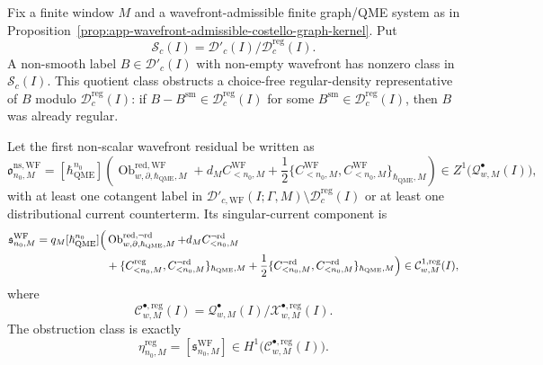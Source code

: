 \begin{thm}
\label{thm:wt-wavefront-singular-current-eta-obstruction}
  Fix a finite window \(M\) and a wavefront-admissible finite graph/QME
  system as in
  Proposition~\ref{prop:app-wavefront-admissible-costello-graph-kernel}.
  Put
  \[
    \mathcal S_c(I)
      =
    \mathcal D'_c(I)/\mathcal D^{\mathrm{reg}}_c(I).
  \]
  A non-smooth label \(B\in\mathcal D'_c(I)\) with
  non-empty wavefront has nonzero class in \(\mathcal S_c(I)\).  This
  quotient class obstructs a choice-free regular-density representative of
  \(B\) modulo \(\mathcal D^{\mathrm{reg}}_c(I)\): if
  \(B-B^{\mathrm{sm}}\in\mathcal D^{\mathrm{reg}}_c(I)\) for some
  \(B^{\mathrm{sm}}\in\mathcal D^{\mathrm{reg}}_c(I)\), then \(B\) was
  already regular.

  Let the first non-scalar wavefront residual be written as
  \[
    \mathfrak o^{\mathrm{ns,WF}}_{n_0,M}
      =
      [\hbar_{\mathrm{QME}}^{n_0}]\left(
        \operatorname{Ob}^{\mathrm{red,WF}}_{w,\partial,\hbar_{\mathrm{QME}},M}
        +d_MC^{\mathrm{WF}}_{<n_0,M}
        +\frac12
          \{C^{\mathrm{WF}}_{<n_0,M},
            C^{\mathrm{WF}}_{<n_0,M}\}_{\hbar_{\mathrm{QME}},M}
      \right)
      \in Z^1\bigl(\mathcal Q^\bullet_{w,M}(I)\bigr),
  \]
  with at least one cotangent label in
  \(\mathcal D'_{c,\mathrm{WF}}(I;\Gamma,M)\setminus
  \mathcal D^{\mathrm{reg}}_c(I)\) or at least one distributional
  current counterterm.  Its singular-current component is
  \begin{equation}\label{eq:wt-wavefront-singular-component}
  \begin{aligned}
    \mathfrak s^{\mathrm{WF}}_{n_0,M}
      =
      q_M[\hbar_{\mathrm{QME}}^{n_0}]\Bigl(
        &\operatorname{Ob}^{\mathrm{red},\neg\mathrm{rd}}_{w,\partial,\hbar_{\mathrm{QME}},M}
        +d_MC^{\neg\mathrm{rd}}_{<n_0,M} \\
        &+\{C^{\mathrm{reg}}_{<n_0,M},
             C^{\neg\mathrm{rd}}_{<n_0,M}\}_{\hbar_{\mathrm{QME}},M}
        +\frac12
          \{C^{\neg\mathrm{rd}}_{<n_0,M},
             C^{\neg\mathrm{rd}}_{<n_0,M}\}_{\hbar_{\mathrm{QME}},M}
      \Bigr)
      \in
      \mathcal C^{1,\mathrm{reg}}_{w,M}(I),
  \end{aligned}
  \end{equation}
  where
  \[
    \mathcal C^{\bullet,\mathrm{reg}}_{w,M}(I)
      =
    \mathcal Q^\bullet_{w,M}(I)/
    \mathcal X^{\bullet,\mathrm{reg}}_{w,M}(I).
  \]
  The obstruction class is exactly
  \[
    \eta^{\mathrm{reg}}_{n_0,M}
      =
    [\mathfrak s^{\mathrm{WF}}_{n_0,M}]
      \in
    H^1\bigl(\mathcal C^{\bullet,\mathrm{reg}}_{w,M}(I)\bigr).
  \]


\end{thm}
